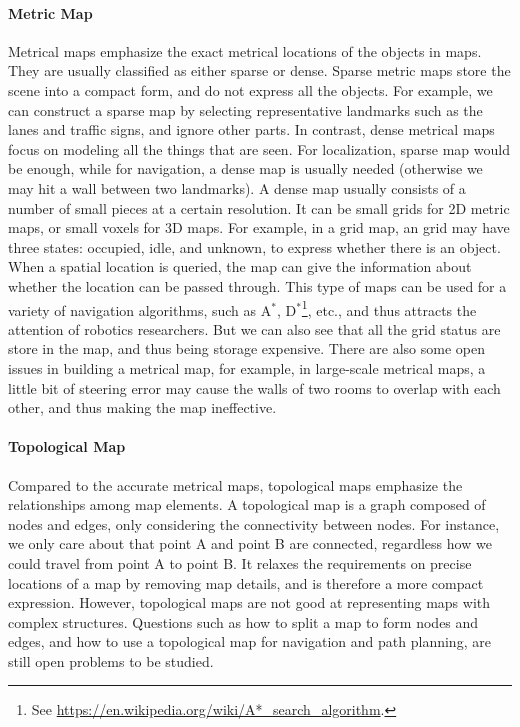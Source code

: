 \paragraph{Metric Map}
Metrical maps emphasize the exact metrical locations of the objects in maps. They are usually classified as either sparse or dense. Sparse metric maps store the scene into a compact form, and do not express all the objects. For example, we can construct a sparse map by selecting representative landmarks such as the lanes and traffic signs, and ignore other parts. In contrast, dense metrical maps focus on modeling all the things that are seen. For localization, sparse map would be enough, while for navigation, a dense map is usually needed (otherwise we may hit a wall between two landmarks). A dense map usually consists of a number of small pieces at a certain resolution. It can be small grids for 2D metric maps, or small voxels for 3D maps. For example, in a grid map, an grid may have three states: occupied, idle, and unknown, to express whether there is an object. When a spatial location is queried, the map can give the information about whether the location can be passed through. This type of maps can be used for a variety of navigation algorithms, such as A$^*$, D$^*$\footnote{ See \url{https://en.wikipedia.org/wiki/A*_search_algorithm}.}, etc., and thus attracts the attention of robotics researchers. But we can also see that all the grid status are store in the map, and thus being storage expensive. There are also some open issues in building a metrical map, for example, in large-scale metrical maps, a little bit of steering error may cause the walls of two rooms to overlap with each other, and thus making the map ineffective.

\paragraph{Topological Map}
Compared to the accurate metrical maps, topological maps emphasize the relationships among map elements. A topological map is a graph composed of nodes and edges, only considering the connectivity between nodes. For instance, we only care about that point A and point B are connected, regardless how we could travel from point A to point B. It relaxes the requirements on precise locations of a map by removing map details, and is therefore a more compact expression. However, topological maps are not good at representing maps with complex structures. Questions such as how to split a map to form nodes and edges, and how to use a topological map for navigation and path planning, are still open problems to be studied.

